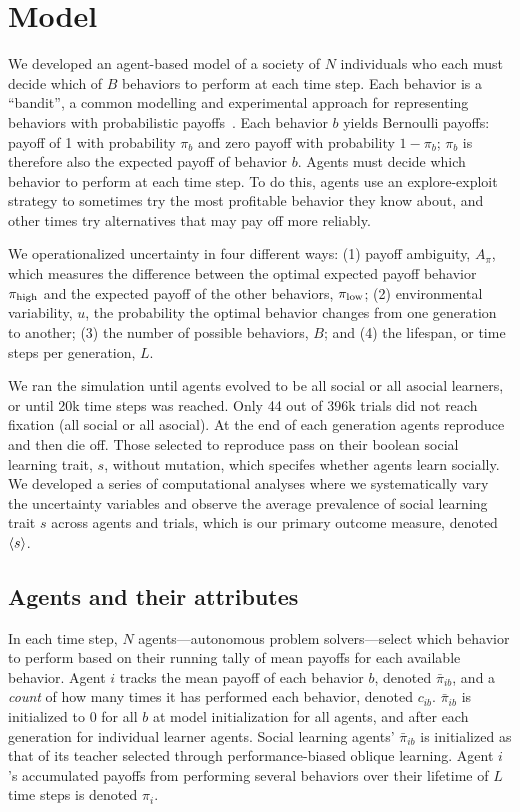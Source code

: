 \documentclass[letterpaper,11.5pt]{scrartcl}
\begin{document}
\section{Model}

We developed an agent-based model of a society of $N$ individuals who each must decide
which of $B$ behaviors to perform at each time step. Each behavior is a ``bandit'',
a common modelling and experimental approach for representing behaviors with
probabilistic payoffs~\cite{SuttonBartoBook, McElreath2005,Rendell2010,Schulz2019}. 
Each behavior $b$ yields Bernoulli payoffs: payoff of 1 with probability $\pi_b$ and zero payoff
with probability $1 - \pi_b$; 
$\pi_b$ is therefore also the expected payoff of behavior $b$. Agents must
decide which behavior to perform at each time step. To do this, agents 
use an explore-exploit strategy to sometimes try the most profitable behavior
they know about, and other times try alternatives that may pay off more reliably. 

We operationalized uncertainty in four different ways: 
(1) payoff ambiguity, $A_\pi$, which measures the difference
between the optimal expected payoff behavior $\pi_{\mathrm{high}}$ and the expected payoff
of the other behaviors, $\pi_{\mathrm{low}}$; 
(2) environmental variability, $u$, the probability the optimal behavior changes from one generation to another; 
(3) the number of possible behaviors, $B$; and 
(4) the lifespan, or time steps per generation, $L$. 

We ran the simulation until agents evolved to be all social or all asocial 
learners, or until 20k time steps was reached. Only 44 out of 396k trials
did not reach fixation (all social or all asocial). At
the end of each generation agents reproduce and then die off. 
Those selected to reproduce
pass on their boolean social learning trait, $s$, without mutation,
which specifes whether agents learn socially. We developed a series of
computational analyses where we systematically vary the uncertainty
variables and observe the average prevalence of social learning trait $s$
across agents and trials, which is our primary outcome measure, 
denoted $\langle s \rangle$. 

\subsection{Agents and their attributes}

In each time step, $N$ agents---autonomous problem solvers---select 
which behavior to perform based on their running tally of mean payoffs for 
each available behavior.
Agent $i$ tracks the mean payoff of each behavior $b$, denoted $\bar\pi_{ib}$, and
a \emph{count} of how many times it has performed each behavior, denoted $c_{ib}$.
$\bar\pi_{ib}$
is initialized to 0 for all $b$ at model initialization for
all agents, and after each generation for individual learner agents. Social
learning agents' $\bar\pi_{ib}$ is initialized as that of its teacher selected
through performance-biased oblique learning. Agent $i$'s accumulated payoffs
from performing several behaviors over their lifetime of $L$ time steps is
denoted $\pi_{i}$.
\end{document}
